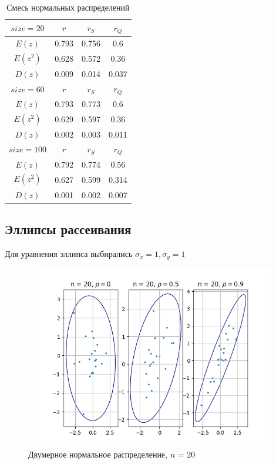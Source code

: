 \begin{table}[H]
	\centering
	\begin{tabular}{| c | c | c | c |}
		
		\hline
		$size = 20$ & $r$      & $r_{S}$ & $r_{Q}$ \\
		\hline
		$E(z)$       & 0.793 & 0.756 & 0.6   \\
		$E(z^2)$    & 0.628 & 0.572 & 0.36  \\
		$D(z)$       & 0.009 & 0.014 & 0.037 \\
		\hline
		$size = 60$ & $r$      & $r_{S}$ & $r_{Q}$ \\
		\hline
		$E(z)$       & 0.793 & 0.773 & 0.6   \\
		$E(z^2)$    & 0.629 & 0.597 & 0.36  \\
		$D(z)$      & 0.002 & 0.003 & 0.011 \\
		\hline
		$size = 100$ & $r$      & $r_{S}$ & $r_{Q}$ \\
		\hline
		$E(z)$        & 0.792 & 0.774 & 0.56  \\
		$E(z^2)$     & 0.627 & 0.599 & 0.314 \\
		$D(z)$        & 0.001 & 0.002 & 0.007 \\
		\hline
		
	\end{tabular}{}
	\caption{Смесь нормальных распределений}
	\label{tab:mix_normal}
\end{table}
\subsection{Эллипсы рассеивания}
\noindent Для уравнения эллипса выбирались $\sigma_{x} = 1, \sigma_{y} = 1$

\begin{figure}[H]
	\centering
	\includegraphics[width = 13cm, height = 8cm]{resources/5_20.png}
	\caption{Двумерное нормальное распределение, $n$ = 20}
	\label{fig:n20}
\end{figure}

